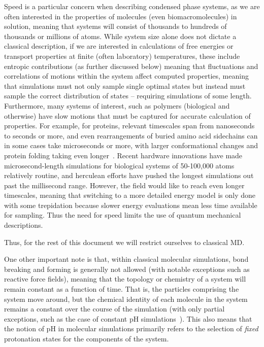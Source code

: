 \documentclass[9pt,bestpractices]{livecoms}
\begin{document}
Speed is a particular concern when describing condensed phase systems, as we are often interested in the properties of molecules (even biomacromolecules) in solution, meaning that systems will consist of thousands to hundreds of thousands or millions of atoms.
While system size alone does not dictate a classical description, if we are interested in calculations of free energies or transport properties at finite (often laboratory) temperatures, these include entropic contributions (as further discussed below) meaning that fluctuations and correlations of motions within the system affect computed properties, meaning that simulations must not only sample single optimal states but instead must sample the correct distribution of states -- requiring simulations of some length.
Furthermore, many systems of interest, such as polymers (biological and otherwise) have slow motions that must be captured for accurate calculation of properties.
For example, for proteins, relevant timescales span from nanoseconds to seconds or more, and even rearrangements of buried amino acid sidechains can in some cases take microseconds or more, with larger conformational changes and protein folding taking even longer~\cite{Schlick:2010:, Mobley:2012:JComputAidedMolDes}.
Recent hardware innovations have made microsecond-length simulations for biological systems of 50-100,000 atoms relatively routine, and herculean efforts have pushed the longest simulations out past the millisecond range.
However, the field would like to reach even longer timescales, meaning that switching to a more detailed energy model is only done with some trepidation because slower energy evaluations mean less time available for sampling.
Thus the need for speed limits the use of quantum mechanical descriptions.

Thus, for the rest of this document we will restrict ourselves to classical MD.

One other important note is that, within classical molecular simulations, bond breaking and forming is generally not allowed (with notable exceptions such as reactive force fields),  meaning that the topology or chemistry of a system will remain constant as a function of time.
That is, the particles comprising the system move around, but the chemical identity of each molecule in the system remains a constant over the course of the simulation (with only partial exceptions, such as the case of constant pH simulations~\cite{Chen:2014:MolSimul}).
This also means that the notion of pH in molecular simulations primarily refers to the selection of \emph{fixed} protonation states for the components of the system.
\end{document}

